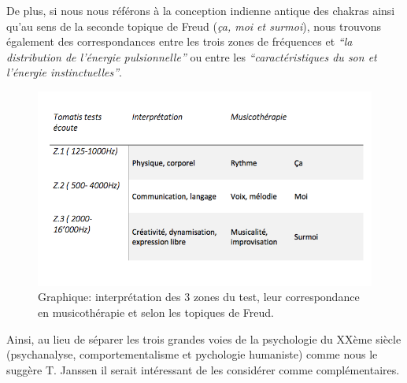                             De plus, si nous nous référons à la conception indienne antique des chakras
                            ainsi qu'au sens de la seconde
                            topique de Freud (\textit{ça, moi et surmoi}), nous trouvons également des correspondances
                            entre les trois zones de
                            fréquences et \textit       {``la distribution de l'énergie pulsionnelle''} ou entre
                            les
                            \textit{``caractéristiques du son et l'énergie
                            instinctuelles''}\autocite[ch. 13]{auriol_cle_1996}.

                            \begin{figure}
                            	\centering
                            	\includegraphics[width=1.0\linewidth]{images/testinterpmusico}
                            	\caption[ L'interprétation des 3 zones et leur correspondance
                                    en musicothérapie]{Graphique: interprétation des 3 zones du
                                      test, leur correspondance en musicothérapie et selon les
                                      topiques de Freud.}

                            	\label{graphiquecolonnetestmusico}
                                  \end{figure}






                            Ainsi, au lieu de séparer les trois grandes voies de la psychologie du
                            XXème siècle (psychanalyse, comportementalisme et pychologie
                            humaniste) comme nous le suggère T. Janssen
                            \autocite[197]{van_eersel_cerveau} il serait intéressant de les
                            considérer comme complémentaires.







